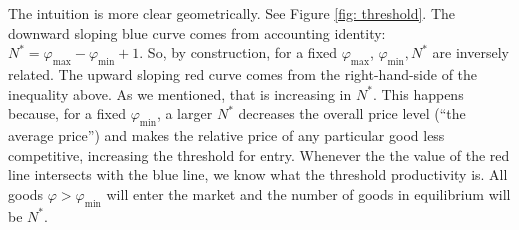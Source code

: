 \documentclass[11pt,letterpaper]{article}
\begin{document}
The intuition is more clear geometrically. See Figure \ref{fig: threshold}. The downward sloping blue curve comes from accounting identity: $N^*=\varphi_{\max} - \varphi_{\min}+1$. So, by construction, for a fixed $\varphi_{\max}$, $\varphi_{\min},N^*$ are inversely related. The upward sloping red curve comes from the right-hand-side of the inequality above. As we mentioned, that is increasing in $N^*$. This happens because, for a fixed $\varphi_{\min}$, a larger $N^*$ decreases the overall price level (``the average price'') and makes the relative price of any particular good less competitive, increasing the threshold for entry. Whenever the the value of the red line intersects with the blue line, we know what the threshold productivity is. All goods $\varphi > \varphi_{\min}$  will enter the market and the number of goods in equilibrium will be $N^*$.

\end{document}
